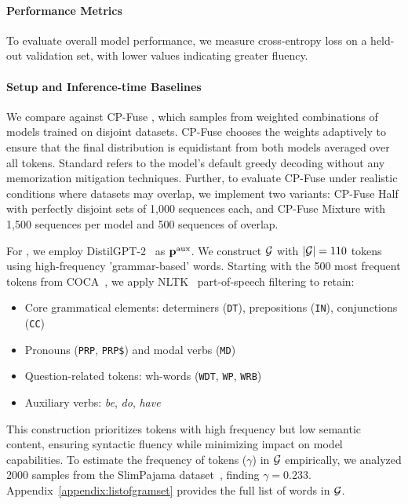 \paragraph{Performance Metrics}
To evaluate overall model performance, we measure cross-entropy loss on a held-out validation set, with lower values indicating greater fluency. 

\paragraph{Setup and Inference-time Baselines}
We compare against CP-Fuse \citep{abad2024copyright}, which samples from weighted combinations of models trained on disjoint datasets. CP-Fuse chooses the weights adaptively to ensure that the final distribution is equidistant from both models averaged over all tokens. Standard refers to the model's default greedy decoding without any memorization mitigation techniques. Further, to evaluate CP-Fuse under realistic conditions where datasets may overlap, we implement two variants: CP-Fuse Half with perfectly disjoint sets of 1,000 sequences each, and CP-Fuse Mixture with 1,500 sequences per model and 500 sequences of overlap.

For \sys, we employ DistilGPT-2~\citep{distilgpt2} as \(\mathbf{p}^{\text{aux}}\). We construct \(\mathcal{G}\) with \(|\mathcal{G}| = 110\) tokens using high-frequency 'grammar-based' words. Starting with the 500 most frequent tokens from COCA~\citep{davies2010corpus}, we apply NLTK~\citep{loper2002nltk} part-of-speech filtering to retain:
\begin{itemize}
    \item Core grammatical elements: determiners (\texttt{DT}), prepositions (\texttt{IN}), conjunctions (\texttt{CC})
    \item Pronouns (\texttt{PRP}, \texttt{PRP\$}) and modal verbs (\texttt{MD})
    \item Question-related tokens: wh-words (\texttt{WDT}, \texttt{WP}, \texttt{WRB})
    \item Auxiliary verbs: \textit{be}, \textit{do}, \textit{have}
\end{itemize}
This construction prioritizes tokens with high frequency but low semantic content, ensuring syntactic fluency while minimizing impact on model capabilities. To estimate the frequency of tokens (\(\gamma\)) in \(\mathcal{G}\) empirically, we analyzed 2000 samples from the SlimPajama dataset~\citep{soboleva2023slimpajama}, finding \(\gamma = 0.233\). Appendix~\ref{appendix:listofgramset} provides the full list of words in \(\mathcal{G}\).

